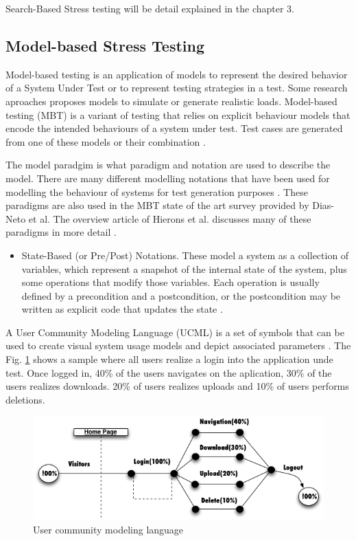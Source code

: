 Search-Based Stress testing will be detail explained in the chapter 3.

\subsection{Model-based Stress Testing}

Model-based testing is an application  of models to represent the desired behavior of a System Under Test or to represent testing strategies in a test. Some research aproaches proposes models to simulate or  generate realistic loads. Model-based testing (MBT) is a variant of testing that relies on explicit behaviour models that encode the intended behaviours of a system under test. Test cases are generated from one of these models or their combination \cite{MarkUtting2012} \cite{Bertolino2008}. 

The model paradgim is what paradigm and notation are used to describe the model. There are many different modelling notations that have been used for modelling the behaviour of systems for test generation purposes \cite{MarkUtting2012}. These paradigms are also used in the MBT state of the art survey provided by Dias-Neto et al. The overview article of Hierons et al.  discusses many of these paradigms in more detail \cite{Hierons2009} \cite{MarkUtting2012}. 

\begin{itemize}
\item State-Based (or Pre/Post) Notations. These model a system as a collection of variables, which represent a snapshot of the internal state of the system, plus some operations that modify those variables. Each operation is usually defined by a precondition and a postcondition, or the postcondition may be written as explicit code that updates the state \cite{MarkUtting2012}.
\end{itemize}

A User Community Modeling Language (UCML) is a set of symbols that can be used to create visual system usage models and depict associated parameters \cite{Wang2013}. The Fig. \ref{fig:ucml} shows a sample where all users realize a login into the application unde test. Once logged in, 40\% of the users navigates on the aplication, 30\%  of the users realizes downloads. 20\% of users realizes uploads and 10\% of users performs deletions.



\begin{figure}[!ht]
\centering
\includegraphics[width=1\textwidth]{./images/ucml.png}
\caption{User community modeling language \cite{Wang2013}}
\label{fig:ucml}

\end{figure}

